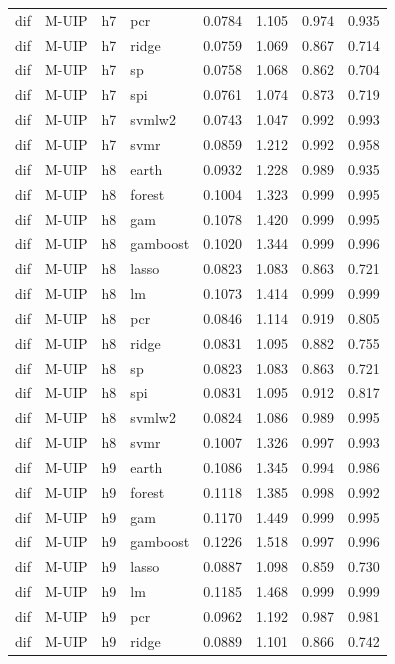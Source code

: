 \begin{ThreePartTable}
\begin{longtable}[t]{llclcccc}
dif & M-UIP & h7 & pcr & 0.0784 & 1.105 & 0.974 & 0.935\\
dif & M-UIP & h7 & ridge & 0.0759 & 1.069 & 0.867 & 0.714\\
dif & M-UIP & h7 & sp & 0.0758 & 1.068 & 0.862 & 0.704\\
dif & M-UIP & h7 & spi & 0.0761 & 1.074 & 0.873 & 0.719\\
dif & M-UIP & h7 & svmlw2 & 0.0743 & 1.047 & 0.992 & 0.993\\
dif & M-UIP & h7 & svmr & 0.0859 & 1.212 & 0.992 & 0.958\\
\addlinespace
dif & M-UIP & h8 & earth & 0.0932 & 1.228 & 0.989 & 0.935\\
dif & M-UIP & h8 & forest & 0.1004 & 1.323 & 0.999 & 0.995\\
dif & M-UIP & h8 & gam & 0.1078 & 1.420 & 0.999 & 0.995\\
dif & M-UIP & h8 & gamboost & 0.1020 & 1.344 & 0.999 & 0.996\\
dif & M-UIP & h8 & lasso & 0.0823 & 1.083 & 0.863 & 0.721\\
dif & M-UIP & h8 & lm & 0.1073 & 1.414 & 0.999 & 0.999\\
dif & M-UIP & h8 & pcr & 0.0846 & 1.114 & 0.919 & 0.805\\
dif & M-UIP & h8 & ridge & 0.0831 & 1.095 & 0.882 & 0.755\\
dif & M-UIP & h8 & sp & 0.0823 & 1.083 & 0.863 & 0.721\\
dif & M-UIP & h8 & spi & 0.0831 & 1.095 & 0.912 & 0.817\\
dif & M-UIP & h8 & svmlw2 & 0.0824 & 1.086 & 0.989 & 0.995\\
dif & M-UIP & h8 & svmr & 0.1007 & 1.326 & 0.997 & 0.993\\
\addlinespace
dif & M-UIP & h9 & earth & 0.1086 & 1.345 & 0.994 & 0.986\\
dif & M-UIP & h9 & forest & 0.1118 & 1.385 & 0.998 & 0.992\\
dif & M-UIP & h9 & gam & 0.1170 & 1.449 & 0.999 & 0.995\\
dif & M-UIP & h9 & gamboost & 0.1226 & 1.518 & 0.997 & 0.996\\
dif & M-UIP & h9 & lasso & 0.0887 & 1.098 & 0.859 & 0.730\\
dif & M-UIP & h9 & lm & 0.1185 & 1.468 & 0.999 & 0.999\\
dif & M-UIP & h9 & pcr & 0.0962 & 1.192 & 0.987 & 0.981\\
dif & M-UIP & h9 & ridge & 0.0889 & 1.101 & 0.866 & 0.742\\

\end{longtable}
\end{ThreePartTable}
